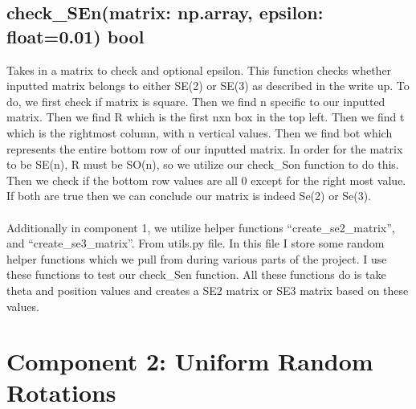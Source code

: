\documentclass[12pt]{article}
\begin{document}
\subsection*{check\_SEn(matrix: np.array, epsilon: float=0.01) \rightarrow{} bool}
Takes in a matrix to check and optional epsilon. This function checks whether inputted matrix belongs to either SE(2) or SE(3) as described in the write up. To do, we first check if matrix is square. Then we find n specific to our inputted matrix. Then we find R which is the first nxn box in the top left. Then we find t which is the rightmost column, with n vertical values. Then we find bot which represents the entire bottom row of our inputted matrix. In order for the matrix to be SE(n), R must be SO(n), so we utilize our check\_Son function to do this. Then we check if the bottom  row values are all 0 except for the right most value. If both are true then we can conclude our matrix is indeed Se(2) or Se(3).
\\ \\
Additionally in component 1, we utilize helper functions “create\_se2\_matrix”, and “create\_se3\_matrix”. From utils.py file. In this file I store some random helper functions which we pull from during various parts of the project. I use these functions to test our check\_Sen function. All these functions do is take theta and position values and creates a SE2 matrix or SE3 matrix based on these values.

\section*{Component 2: Uniform Random Rotations}
\end{document}
